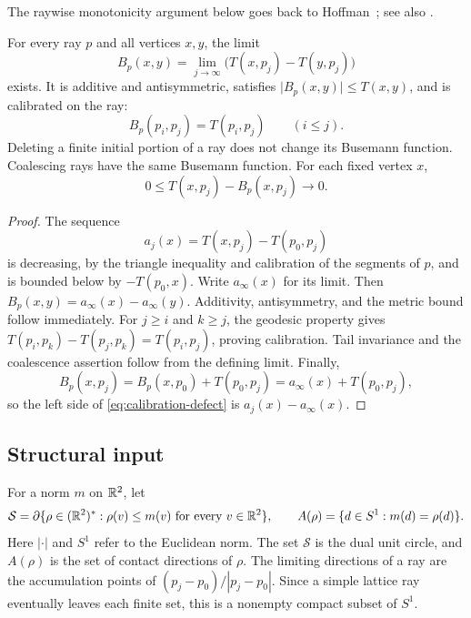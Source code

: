 The raywise monotonicity argument below goes back to
Hoffman~\cite{Hoffman2005}; see also
\cite[Lemma~4.1 and the discussion after Proposition~4.5]{AhlbergHoffman}.

\begin{lemma}\label{lem:busemann-basic}
For every ray \(p\) and all vertices \(x,y\), the limit
\begin{equation}\label{eq:busemann-definition}
 B_p(x,y)=\lim_{j\to\infty}\bigl(T(x,p_j)-T(y,p_j)\bigr)
\end{equation}
exists. It is additive and antisymmetric, satisfies
\(\lvert B_p(x,y)\rvert\le T(x,y)\), and is calibrated on the ray:
\[
 B_p(p_i,p_j)=T(p_i,p_j)\qquad(i\le j).
\]
Deleting a finite initial portion of a ray does not change its Busemann
function. Coalescing rays have the same Busemann function. For each
fixed vertex \(x\),
\begin{equation}\label{eq:calibration-defect}
 0\le T(x,p_j)-B_p(x,p_j)\longrightarrow0.
\end{equation}
\end{lemma}
\begin{proof}
The sequence
\[
 a_j(x)=T(x,p_j)-T(p_0,p_j)
\]
is decreasing, by the triangle inequality and calibration of the
segments of \(p\), and is bounded below by \(-T(p_0,x)\).
Write \(a_\infty(x)\) for its limit. Then
\(B_p(x,y)=a_\infty(x)-a_\infty(y)\).
Additivity, antisymmetry, and the metric bound follow immediately.
For \(j\ge i\) and \(k\ge j\), the geodesic property gives
\(T(p_i,p_k)-T(p_j,p_k)=T(p_i,p_j)\), proving calibration.
Tail invariance and the coalescence assertion follow from the defining
limit. Finally,
\[
 B_p(x,p_j)=B_p(x,p_0)+T(p_0,p_j)
           =a_\infty(x)+T(p_0,p_j),
\]
so the left side of \eqref{eq:calibration-defect} is
\(a_j(x)-a_\infty(x)\).
\end{proof}

\subsection{Structural input}
For a norm \(m\) on \(\mathbb R^2\), let
\[
 \mathcal S=\partial\{\rho\in(\mathbb R^2)^*:\rho(v)\le m(v)
                                      \text{ for every }v\in\mathbb R^2\},
 \qquad
 A(\rho)=\{d\in S^1:m(d)=\rho(d)\}.
\]
Here \(|\cdot|\) and \(S^1\) refer to the Euclidean norm. The set
\(\mathcal S\) is the dual unit circle, and \(A(\rho)\) is the set of
contact directions of \(\rho\).
The limiting directions of a ray are the accumulation points of
\((p_j-p_0)/|p_j-p_0|\).
Since a simple lattice ray eventually leaves each finite set, this is
a nonempty compact subset of \(S^1\).

